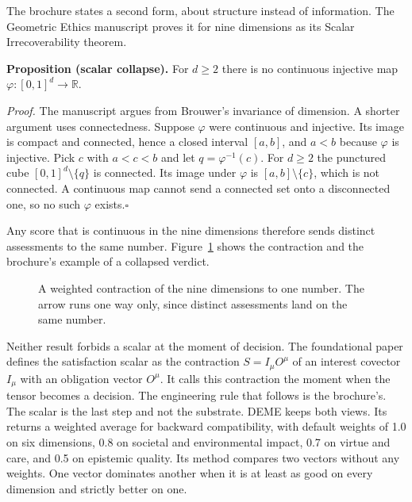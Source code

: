 The brochure states a second form, about structure instead of information.
The Geometric Ethics manuscript proves it for nine dimensions as its Scalar Irrecoverability
theorem.

\medskip\noindent\textbf{Proposition (scalar collapse).} For $d \geq 2$ there is no continuous
injective map $\varphi\colon [0,1]^d \to \mathbb{R}$.

\medskip\noindent\textit{Proof.} The manuscript argues from Brouwer's invariance of dimension. A
shorter argument uses connectedness. Suppose $\varphi$ were continuous and injective. Its image is
compact and connected, hence a closed interval $[a,b]$, and $a<b$ because $\varphi$ is injective.
Pick $c$ with $a<c<b$ and let $q = \varphi^{-1}(c)$. For $d \geq 2$ the punctured cube
$[0,1]^d \setminus \{q\}$ is connected. Its image under $\varphi$ is $[a,b]\setminus\{c\}$, which
is not connected. A continuous map cannot send a connected set onto a disconnected one, so no
such $\varphi$ exists.\hfill$\square$

Any score that is continuous in the nine dimensions therefore sends distinct assessments to the
same number. Figure~\ref{fig:ge-scalar} shows the contraction and the brochure's example of a
collapsed verdict.

\begin{figure}[t]
\centering

\caption{A weighted contraction of the nine dimensions to one number. The arrow runs one way
only, since distinct assessments land on the same number.}
\label{fig:ge-scalar}
\end{figure}

Neither result forbids a scalar at the moment of decision. The foundational paper defines the
satisfaction scalar as the contraction $S = I_\mu O^\mu$ of an interest covector $I_\mu$ with an
obligation vector $O^\mu$. It calls this contraction the moment when the tensor becomes a decision.
The engineering rule that follows is the brochure's. The scalar is the last step and not the
substrate.
DEME keeps both views. Its  returns a weighted average for backward
compatibility, with default weights of 1.0 on six dimensions, 0.8 on societal and environmental
impact, 0.7 on virtue and care, and 0.5 on epistemic quality.
Its  method compares two vectors without any weights. One vector dominates another
when it is at least as good on every dimension and strictly better on one.

